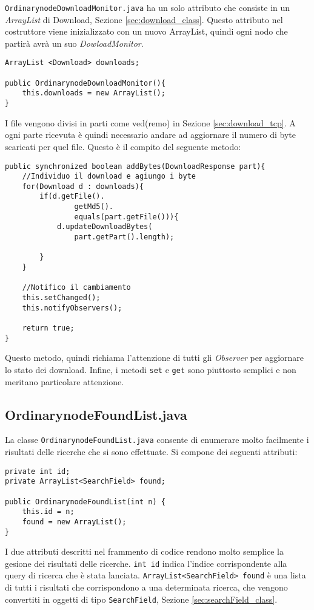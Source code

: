 \verb|OrdinarynodeDownloadMonitor.java| ha un solo attributo che consiste in un \emph{ArrayList} di Download, Sezione \ref{sec:download_class}.
Questo attributo nel costruttore viene inizializzato con un nuovo ArrayList, quindi ogni nodo che partirà avrà un suo \emph{DowloadMonitor}.
\begin{lstlisting}
ArrayList <Download> downloads;
    
public OrdinarynodeDownloadMonitor(){
	this.downloads = new ArrayList();
}
\end{lstlisting}

I file vengono divisi in parti come ved(remo) in Sezione \ref{sec:download_tcp}. A ogni parte ricevuta è quindi necessario andare ad aggiornare il numero di byte scaricati per quel file.
Questo è il compito del seguente metodo:
\begin{lstlisting}
public synchronized boolean addBytes(DownloadResponse part){
	//Individuo il download e agiungo i byte
	for(Download d : downloads){
		if(d.getFile().
				getMd5().
				equals(part.getFile())){
			d.updateDownloadBytes(
				part.getPart().length);
			
		}
	}

	//Notifico il cambiamento
	this.setChanged();
	this.notifyObservers();

	return true;
}
\end{lstlisting}

Questo metodo, quindi richiama l'attenzione di tutti gli \emph{Observer} per aggiornare lo stato dei download.
Infine, i metodi \verb|set| e \verb|get| sono piuttosto semplici e non meritano particolare attenzione.

\subsection{OrdinarynodeFoundList.java}
La classe \verb|OrdinarynodeFoundList.java| consente di enumerare molto facilmente i risultati delle ricerche che si sono effettuate.
Si compone dei seguenti attributi:
\begin{lstlisting}
private int id;
private ArrayList<SearchField> found;

public OrdinarynodeFoundList(int n) {
	this.id = n;
	found = new ArrayList();
}
\end{lstlisting}
I due attributi descritti nel frammento di codice rendono molto semplice la gesione dei risultati delle ricerche.
\verb|int id| indica l'indice corrispondente alla query di ricerca che è stata lanciata.
\verb|ArrayList<SearchField> found| è una lista di tutti i risultati che corrispondono a una determinata ricerca, che vengono convertiti in oggetti di tipo \verb|SearchField|, Sezione \ref{sec:searchField_class}.

